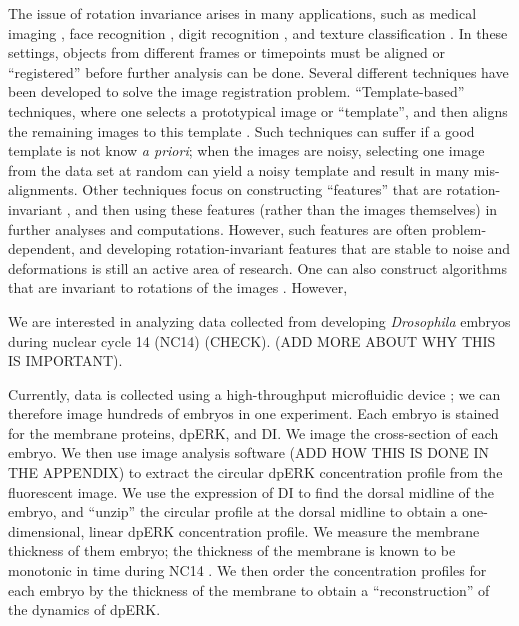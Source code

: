 \documentclass[10pt]{article}
\begin{document}
The issue of rotation invariance arises in many applications, such as medical imaging \cite{hajnal2010medical}, face recognition \cite{rowley1998rotation}, digit recognition \cite{simard1992efficient}, and texture classification \cite{greenspan1994rotation}.
%
In these settings, objects from different frames or timepoints must be aligned or ``registered'' before further analysis can be done.
%
%
%
Several different techniques have been developed to solve the image registration problem. 
%
``Template-based'' techniques, where one selects a prototypical image or ``template'', and then aligns the remaining images to this template \cite{ahuja2007template}.
%
Such techniques can suffer if a good template is not know {\em a priori}; when the images are noisy, selecting one image from the data set at random can yield a noisy template and result in many mis-alignments. 
%
Other techniques focus on constructing ``features'' that are rotation-invariant \cite{flusser2000independence, lowe1999object, sadler1992shift, ojala2002multiresolution}, and then using these features (rather than the images themselves) in further analyses and computations.
%
However, such features are often problem-dependent, and developing rotation-invariant features that are stable to noise and deformations is still an active area of research.
%
One can also construct algorithms that are invariant to rotations of the images \cite{hilai1004recognition, zhao2013fourier}.
%
However, 

We are interested in analyzing data collected from developing {\em Drosophila} embryos during nuclear cycle 14 (NC14) (CHECK).
%
(ADD MORE ABOUT WHY THIS IS IMPORTANT).

Currently, data is collected using a high-throughput microfluidic device \cite{chung2010microfluidic}; we can therefore image hundreds of embryos in one experiment.
%
Each embryo is stained for the membrane proteins, dpERK, and DI. 
%
We image the cross-section of each embryo.
%
We then use image analysis software (ADD HOW THIS IS DONE IN THE APPENDIX) to extract the circular dpERK concentration profile from the fluorescent image.
%
We use the expression of DI to find the dorsal midline of the embryo, and ``unzip'' the circular profile at the dorsal midline to obtain a one-dimensional, linear dpERK concentration profile.
%
We measure the membrane thickness of them embryo; the thickness of the membrane is known to be monotonic in time during NC14 \cite{...}. 
%
We then order the concentration profiles for each embryo by the thickness of the membrane to obtain a ``reconstruction'' of the dynamics of dpERK.
\end{document}
